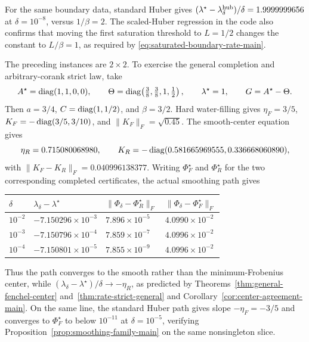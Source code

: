For the same boundary data, standard Huber gives
\((\lambda^\star-\lambda_\delta^{\rm hub})/\delta=1.9999999656\) at
\(\delta=10^{-8}\), versus \(1/\beta=2\).  The scaled-Huber regression in
the code also confirms that moving the first saturation threshold to
\(L=1/2\) changes the constant to \(L/\beta=1\), as required by
\eqref{eq:saturated-boundary-rate-main}.

The preceding instances are \(2\times2\).  To exercise the general
completion and arbitrary-corank strict law, take
\[
 A^\star=\operatorname{diag}(1,1,0,0),\qquad
 \Theta=\operatorname{diag}\!\left(\tfrac38,\tfrac38,1,\tfrac12\right),\qquad
 \lambda^\star=1,\qquad G=A^\star-\Theta.
\]
Then \(a=3/4\), \(C=\operatorname{diag}(1,1/2)\), and \(\beta=3/2\).  Hard
water-filling gives
\(\eta_F=3/5\),
\(K_F=-\operatorname{diag}(3/5,3/10)\), and
\(\|K_F\|_F=\sqrt{0.45}\).  The smooth-center equation gives
\[
 \eta_R=0.715080068980,\qquad
 K_R=-\operatorname{diag}(0.581665969555,0.336668060890),
\]
with \(\|K_F-K_R\|_F=0.040996138377\).  Writing
\(\Phi_F^\star\) and \(\Phi_R^\star\) for the two corresponding completed
certificates, the actual smoothing path gives
\begin{center}
\begin{tabular}{@{}llll@{}}
\toprule
\(\delta\) & \(\lambda_\delta-\lambda^\star\) &
\(\|\Phi_\delta-\Phi_R^\star\|_F\) &
\(\|\Phi_\delta-\Phi_F^\star\|_F\)\\
\midrule
\(10^{-2}\) & \(-7.150296\!\times\!10^{-3}\) & \(7.896\!\times\!10^{-5}\) & \(4.0990\!\times\!10^{-2}\)\\
\(10^{-3}\) & \(-7.150796\!\times\!10^{-4}\) & \(7.859\!\times\!10^{-7}\) & \(4.0996\!\times\!10^{-2}\)\\
\(10^{-4}\) & \(-7.150801\!\times\!10^{-5}\) & \(7.855\!\times\!10^{-9}\) & \(4.0996\!\times\!10^{-2}\)\\
\bottomrule
\end{tabular}
\end{center}
Thus the path converges to the smooth rather than the minimum-Frobenius
center, while
\((\lambda_\delta-\lambda^\star)/\delta\to-\eta_R\), as predicted by
Theorems~\ref{thm:general-fenchel-center} and~\ref{thm:rate-strict-general}
and Corollary~\ref{cor:center-agreement-main}.
On the same line, the standard Huber path gives slope
\(-\eta_F=-3/5\) and converges to \(\Phi_F^\star\) to below
\(10^{-11}\) at \(\delta=10^{-5}\), verifying
Proposition~\ref{prop:smoothing-family-main} on the same nonsingleton slice.

